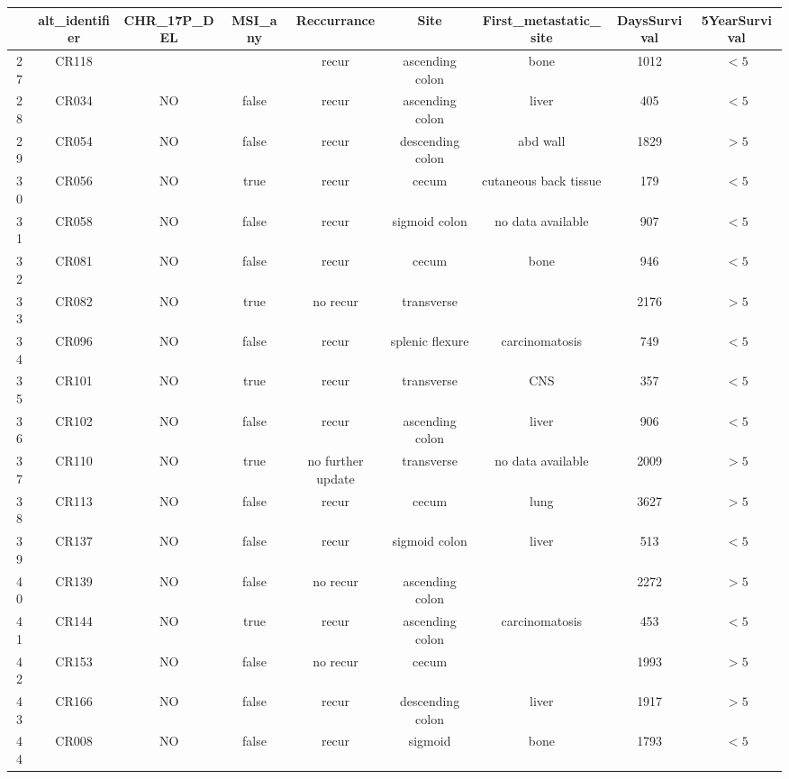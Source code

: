 \begin{table}
  \centering
  \begin{longtable}{|c|c|c|c|c|c|c|c|c|}
\hline
 & \textbf{alt\_identifier} & \textbf{CHR\_17P\_DEL} & \textbf{MSI\_any} & \textbf{Reccurrance} & \textbf{Site} & \textbf{First\_metastatic\_site} & \textbf{DaysSurvival} & \textbf{5YearSurvival} \\
\hline
27 & CR118 &  &  & recur & ascending colon & bone & 1012 &  $<5$ \\
\hline
28 & CR034 & NO & false & recur & ascending colon & liver & 405 & $<5$ \\
\hline
29 & CR054 & NO & false & recur & descending colon & abd wall & 1829 & $>5$ \\
\hline
30 & CR056 & NO & true & recur & cecum & cutaneous back tissue & 179 & $<5$ \\
\hline
31 & CR058 & NO & false & recur & sigmoid colon & no data available & 907 & $<5$ \\
\hline
32 & CR081 & NO & false & recur & cecum & bone & 946 & $<5$ \\
\hline
33 & CR082 & NO & true & no recur & transverse &   & 2176 & $>5$ \\
\hline
34 & CR096 & NO & false & recur & splenic flexure & carcinomatosis & 749 & $<5$ \\
\hline
35 & CR101 & NO & true & recur & transverse & CNS & 357 & $<5$ \\
\hline
36 & CR102 & NO & false & recur & ascending colon & liver & 906 & $<5$ \\
\hline
37 & CR110 & NO & true & no further update & transverse & no data available & 2009 & $>5$ \\
\hline
38 & CR113 & NO & false & recur & cecum & lung & 3627 & $>5$ \\
\hline
39 & CR137 & NO & false & recur & sigmoid colon & liver & 513 & $<5$ \\
\hline
40 & CR139 & NO & false & no recur & ascending colon &   & 2272 & $>5$ \\
\hline
41 & CR144 & NO & true & recur & ascending colon & carcinomatosis & 453 & $<5$ \\
\hline
42 & CR153 & NO & false & no recur & cecum &   & 1993 & $>5$ \\
\hline
43 & CR166 & NO & false & recur & descending colon & liver & 1917 & $>5$ \\
\hline
44 &CR008 & NO & false & recur & sigmoid & bone & 1793 & $<5$ \\

\end{longtable}
\end{table}
